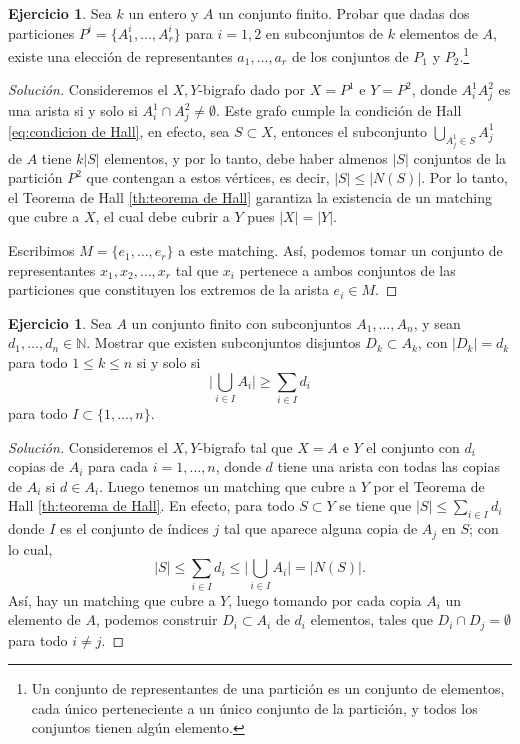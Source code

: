 \documentclass[12pt]{report}
\theoremstyle{plain}
\theoremstyle{definition}
\newtheorem{exercise}[theorem]{Ejercicio}
\newenvironment{solution}{\begin{proof}[Solución]}{\end{proof}}
\newcommand{\naturals}{\mathbb{N}}
\newcommand{\abs}[1]{\left \vert #1 \right \vert}
\begin{document}
\begin{exercise}
Sea $k$ un entero y $A$ un conjunto finito. Probar que dadas dos particiones $P^i = \{A^i_1, \ldots, A^i_r\}$ para $i = 1,2$ en subconjuntos de $k$ elementos de $A$, existe una elección de representantes $a_1, \ldots, a_r$ de los conjuntos de $P_1$ y $P_2$.\footnote{Un conjunto de representantes de una partición es un conjunto de elementos, cada único perteneciente a un único conjunto de la partición, y todos los conjuntos tienen algún elemento.}
\end{exercise}
\begin{solution}
Consideremos el $X,Y$-bigrafo dado por $X= P^1$ e $Y = P^2$, donde $A^1_i A^2_j$ es una arista si y solo si $A^1_i \cap A^2_j \neq \emptyset$. Este grafo cumple la condición de Hall \ref{eq:condicion de Hall}, en efecto, sea $S \subset X$, entonces el subconjunto $\bigcup_{A^1_j \in S} A^1_j$ de $A$ tiene $k \abs S$ elementos, y por lo tanto, debe haber almenos $\abs S$ conjuntos de la partición $P^2$ que contengan a estos vértices, es decir, $\abs S \leq \abs {N(S)}$. Por lo tanto, el Teorema de Hall \ref{th:teorema de Hall} garantiza la existencia de un matching que cubre a $X$, el cual debe cubrir a $Y$ pues $\abs X = \abs Y$.

Escribimos $M = \{e_1,\ldots,e_r\}$ a este matching. Así, podemos tomar un conjunto de representantes $x_1,x_2,\ldots,x_r$ tal que $x_i$ pertenece a ambos conjuntos de las particiones que constituyen los extremos de la arista $e_i \in M$.
\end{solution}

\begin{exercise}
Sea $A$ un conjunto finito con subconjuntos $A_1,\ldots,A_n$, y sean $d_1,\ldots,d_n \in \naturals$. Mostrar que existen subconjuntos disjuntos $D_k \subset A_k$, con $\abs{D_k} = d_k$ para todo $1 \leq k \leq n$ si y solo si
\[
\lvert \bigcup_{i \in I} A_i \rvert \geq \sum_{i \in I} d_i
\]
para todo $I \subset \{1, \ldots, n\}$.
\end{exercise}

\begin{solution}
Consideremos el $X,Y$-bigrafo tal que $X = A$ e $Y$ el conjunto con $d_i$ copias de $A_i$ para cada $i = 1, \ldots, n$, donde $d$ tiene una arista con todas las copias de $A_i$ si $d \in A_i$. Luego tenemos un matching que cubre a $Y$ por el Teorema de Hall \ref{th:teorema de Hall}. En efecto, para todo $S \subset Y$ se tiene que $\abs S \leq \sum_{i \in I} d_i$ donde $I$ es el conjunto de índices $j$ tal que aparece alguna copia de $A_j$ en $S$; con lo cual,
\[
    \abs S \leq \sum_{i \in I} d_i \leq \lvert \bigcup_{i \in I} A_i \rvert = \abs{N(S)}.
\]
Así, hay un matching que cubre a $Y$, luego tomando por cada copia $A_i$ un elemento de $A$, podemos construir $D_i \subset A_i$ de $d_i$ elementos, tales que $D_i \cap D_j = \emptyset$ para todo $i \neq j$.
\end{solution}
\end{document}
